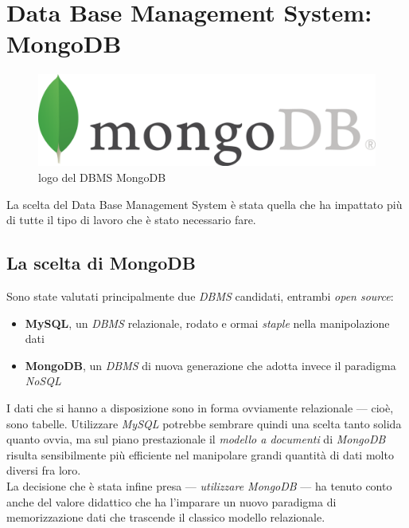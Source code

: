 \section{Data Base Management System: MongoDB}

    \begin{figure}
        \centering
        \caption{logo del DBMS MongoDB}
        \label{mongodb_logo}
    	\includegraphics[scale=0.70]{img/mongodb.png}
    \end{figure}

    La scelta del Data Base Management System è stata quella che ha impattato più di tutte il tipo di lavoro che è stato necessario fare.

    \subsection{La scelta di MongoDB}
    
        Sono state valutati principalmente due \textit{DBMS} candidati, entrambi \textit{open source}:

        \begin{itemize}
            \item \textbf{MySQL}, un \textit{DBMS} relazionale, rodato e ormai \textit{staple} nella manipolazione dati
            \item \textbf{MongoDB}, un \textit{DBMS} di nuova generazione che adotta invece il paradigma \textit{NoSQL} 
        \end{itemize}

        I dati che si hanno a disposizione sono in forma ovviamente relazionale --- cioè, sono tabelle. Utilizzare \textit{MySQL} potrebbe sembrare quindi una scelta tanto solida quanto ovvia, ma sul piano prestazionale il \textit{modello a documenti} di \textit{MongoDB} risulta sensibilmente più efficiente nel manipolare grandi quantità di dati molto diversi fra loro. \\

        La decisione che è stata infine presa --- \textit{utilizzare MongoDB} --- ha tenuto conto anche del valore didattico che ha l'imparare un nuovo paradigma di memorizzazione dati che trascende il classico modello relazionale.

